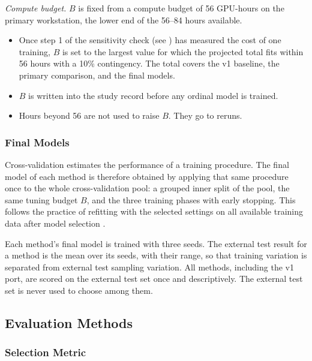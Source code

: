\documentclass{icsthesis}
\newcommand{\secref}[1]{\textit{\nameref{#1}}}
\begin{document}
\begin{mainmatter}
					\textit{Compute budget.} $B$ is fixed from a compute budget of 56 GPU-hours on
					the primary workstation, the lower end of the 56--84 hours available.

					\begin{itemize}
						\item Once step 1 of the sensitivity check (see \secref{sec:sensitivity})
							has measured the cost of one training, $B$ is set to the largest value
							for which the projected total fits within 56 hours with a 10\%
							contingency. The total covers the v1 baseline, the primary comparison, and the final models.
						\item $B$ is written into the study record before any ordinal model is
							trained.
						\item Hours beyond 56 are not used to raise $B$. They go to reruns.
					\end{itemize}

				\subsubsection{Final Models}\label{sec:final}

					Cross-validation estimates the performance of a training procedure. The final
					model of each method is therefore obtained by applying that same procedure once
					to the whole cross-validation pool: a grouped inner split of the pool, the same
					tuning budget $B$, and the three training phases with early stopping. This
					follows the practice of refitting with the selected settings on all available
					training data after model selection \citep{raschka2018}.

					Each method's final model is trained with three seeds. The external test result for a method is the mean over its seeds,
					with their range, so that training variation is separated from external test
					sampling variation. All methods, including the v1 port, are scored on the external test set once and descriptively. The
					external test set is never used to choose among them. 


			\subsection{Evaluation Methods}\label{sec:evaluation}

				\subsubsection{Selection Metric}\label{sec:selmetric}


\end{mainmatter}
\end{document}
